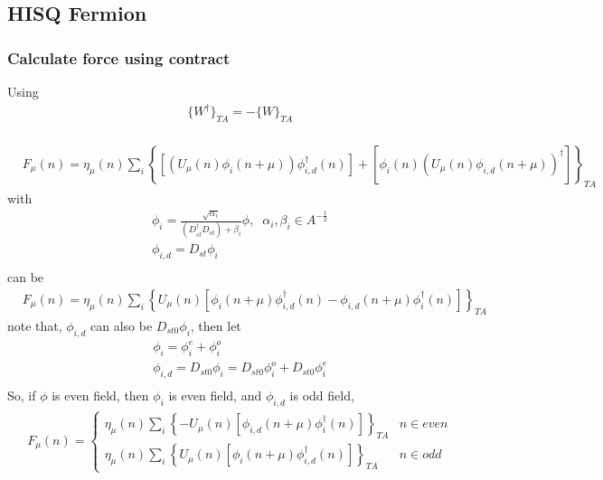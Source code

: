 \subsection{\label{sec:hisq}HISQ Fermion}

\subsubsection{\label{sec:calculate_force_new}Calculate force using contract}

Using
\begin{equation}
\begin{split}
&\{W^{\dagger}\}_{TA}=-\{W\}_{TA}\\
\end{split}
\end{equation}

\begin{equation}
\begin{split}
&F_{\mu}(n)=\eta _{\mu}(n) \sum _i \left\{\left[\left(U_{\mu}(n)\phi _i(n+\mu)\right)\phi _{i,d}^{\dagger}(n)\right]+\left[\phi _i(n)(U_{\mu}(n)\phi _{i,d}(n+\mu))^{\dagger}\right]\right\}_{TA}
\end{split}
\end{equation}
with
\begin{equation}
\begin{split}
&\phi _i = \frac{\sqrt{\alpha _i} }{(D_{st}^{\dagger}D_{st})+\beta _i} \phi,\;\;\alpha _i,\beta _i \in A^{-\frac{1}{2}}\\
&\phi _{i,d}=D_{st}\phi _i\\
\end{split}
\end{equation}
can be
\begin{equation}
\begin{split}
&F_{\mu}(n)=\eta _{\mu}(n) \sum _i \left\{U_{\mu}(n)\left[\phi _i(n+\mu)\phi _{i,d}^{\dagger}(n)-\phi _{i,d}(n+\mu)\phi _i^{\dagger}(n)\right]\right\}_{TA}
\end{split}
\end{equation}
note that, $\phi _{i,d}$ can also be $D_{st0}\phi _i$, then let
\begin{equation}
\begin{split}
&\phi _i = \phi _i^e + \phi _i^o\\
&\phi _{i,d}=D_{st0}\phi _i = D_{st0}\phi _i^o + D_{st0}\phi _i^e\\
\end{split}
\end{equation}
So, if $\phi$ is even field, then $\phi _i$ is even field, and $\phi _{i,d}$ is odd field,
\begin{equation}
\begin{split}
&F_{\mu}(n)=\left\{\begin{array}{cc}\eta _{\mu}(n) \sum _i \left\{-U_{\mu}(n)\left[\phi _{i,d}(n+\mu)\phi _i^{\dagger}(n)\right]\right\}_{TA} & n\in even\\ 
    \eta _{\mu}(n) \sum _i \left\{U_{\mu}(n)\left[\phi _i(n+\mu)\phi _{i,d}^{\dagger}(n)\right]\right\}_{TA}& n\in odd\end{array}\right.
\end{split}
\end{equation}

